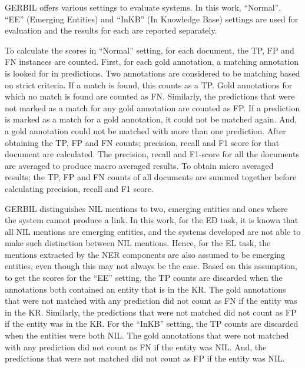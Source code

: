 \documentclass{report}
\theoremstyle{definition}
\theoremstyle{remark}
\begin{document}
GERBIL offers various settings to evaluate systems. In this work, ``Normal'', ``EE'' (Emerging Entities) and ``InKB'' (In Knowledge Base) settings are used for evaluation and the results for each are reported separately. 

To calculate the scores in ``Normal'' setting, for each document, the TP, FP and FN instances are counted. First, for each gold annotation, a matching annotation is looked for in predictions. Two annotations are considered to be matching based on strict criteria. If a match is found, this counts as a TP. Gold annotations for which no match is found are counted as FN. Similarly, the predictions that were not marked as a match for any gold annotation are counted as FP. If a prediction is marked as a match for a gold annotation, it could not be matched again. And, a gold annotation could not be matched with more than one prediction. After obtaining the TP, FP and FN counts; precision, recall and F1 score for that document are calculated. The precision, recall and F1-score for all the documents are averaged to produce macro averaged results. To obtain micro averaged results; the TP, FP and FN counts of all documents are summed together before calculating precision, recall and F1 score. 

GERBIL distinguishes NIL mentions to two, emerging entities and ones where the system cannot produce a link. In this work, for the ED task, it is known that all NIL mentions are emerging entities, and the systems developed are not able to make such distinction between NIL mentions. Hence, for the EL task, the mentions extracted by the NER components are also assumed to be emerging entities, even though this may not always be the case. Based on this assumption, to get the scores for the ``EE'' setting, the TP counts are discarded when the annotations both contained an entity that is in the KR. The gold annotations that were not matched with any prediction did not count as FN if the entity was in the KR. Similarly, the predictions that were not matched did not count as FP if the entity was in the KR. For the ``InKB'' setting, the TP counts are discarded when the entities were both NIL. The gold annotations that were not matched with any prediction did not count as FN if the entity was NIL. And, the predictions that were not matched did not count as FP if the entity was NIL.
\end{document}
